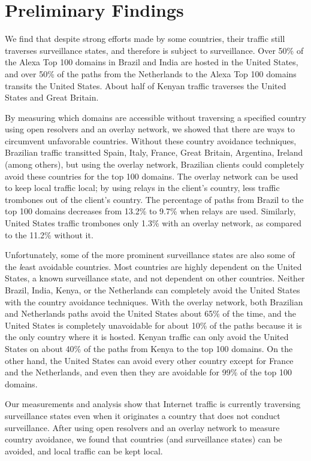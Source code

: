 \section{Preliminary Findings}

We find that despite strong efforts made by some countries,
their traffic still traverses surveillance states, and therefore is
subject to surveillance.  Over 50\% of the Alexa Top 100 domains in
Brazil and India are hosted in the United States, and over 50\% of the
paths from the Netherlands to the Alexa Top 100 domains transits the
United States.  About half of Kenyan traffic traverses the United States
and Great Britain.   

By measuring which domains are accessible without traversing a specified
country using open resolvers and an overlay network, we showed that
there are ways to circumvent unfavorable countries.  Without these
country avoidance techniques, Brazilian traffic transitted Spain, Italy,
France, Great Britain, Argentina, Ireland (among others), but using the
overlay network, Brazilian clients could completely avoid these
countries for the top 100 domains.  The overlay network can be used to
keep local traffic local; by using relays in the client's country, less
traffic trombones out of the client's country.  The percentage of paths
from Brazil to the top 100 domains decreases from 13.2\% to 9.7\% when
relays are used.  Similarly, United States traffic trombones only 1.3\%
with an overlay network, as compared to the 11.2\% without it.   

Unfortunately, some of the more prominent surveillance states are also
some of the {\textit least avoidable} countries.  Most countries are
highly dependent on the United States, a known surveillance state, and
not dependent on other countries.  Neither Brazil, India, Kenya, or the
Netherlands can completely avoid the United States with the country
avoidance techniques.  With the overlay network, both Brazilian and
Netherlands paths avoid the United States about 65\% of the time, and
the United States is completely unavoidable for about 10\% of the paths
because it is the only country where it is hosted.  Kenyan traffic can
only avoid the United States on about 40\% of the paths from Kenya to
the top 100 domains.  On the other hand, the United States can avoid
every other country except for France and the Netherlands, and even then
they are avoidable for 99\% of the top 100 domains.   

Our measurements and analysis show that Internet traffic is currently
traversing surveillance states even when it originates a country that
does not conduct surveillance.  After using open resolvers and an
overlay network to measure country avoidance, we found that countries
(and surveillance states) can be avoided, and local traffic can be kept
local.   

